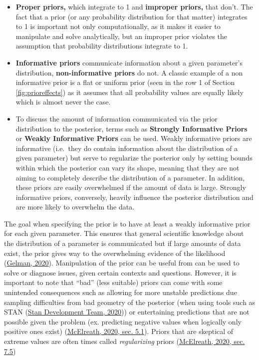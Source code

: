\documentclass[12pt,twoside]{reedthesis}
\begin{document}
\begin{itemize}
\item
  \textbf{Proper priors,} which integrate to 1 and \textbf{improper priors,} that don't. The fact that a prior (or any probability distribution for that matter) integrates to 1 is important not only computationally, as it makes it easier to manipulate and solve analytically, but an improper prior violates the assumption that probability distributions integrate to 1.
\item
  \textbf{Informative priors} communicate information about a given parameter's distribution, \textbf{non-informative priors} do not. A classic example of a non informative prior is a flat or uniform prior (seen in the row 1 of Section \ref{fig:prioreffects}) as it assumes that all probability values are equally likely which is almost never the case.
\item
  To discuss the amount of information communicated via the prior distribution to the posterior, terms such as \textbf{Strongly Informative Priors} or \textbf{Weakly Informative Priors} can be used. Weakly informative priors are informative (i.e.~they do contain information about the distribution of a given parameter) but serve to regularize the posterior only by setting bounds within which the posterior can vary its shape, meaning that they are not aiming to completely describe the distribution of a parameter. In addition, these priors are easily overwhelmed if the amount of data is large. Strongly informative priors, conversely, heavily influence the posterior distribution and are more likely to overwhelm the data.
\end{itemize}
The goal when specifying the prior is to have at least a weakly informative prior for each given parameter. This ensures that general scientific knowledge about the distribution of a parameter is communicated but if large amounts of data exist, the prior gives way to the overwhelming evidence of the likelihood (\protect\hyperlink{ref-gelmanPriorChoiceRecommendations2020}{Gelman, 2020}). Manipulation of the prior can be useful from can be used to solve or diagnose issues, given certain contexts and questions. However, it is important to note that ``bad'' (less suitable) priors can come with some unintended consequences such as allowing for more unstable predictions due sampling difficulties from bad geometry of the posterior (when using tools such as STAN (\protect\hyperlink{ref-standevelopmentteamRStanInterfaceStan2020}{Stan Development Team, 2020})) or entertaining predictions that are not possible given the problem (ex. predicting negative values when logically only positive ones exist) (\protect\hyperlink{ref-mcelreathStatisticalRethinkingBayesian2020}{McElreath, 2020, sec. 5.1}). Priors that are skeptical of extreme values are often times called \emph{regularizing} priors (\protect\hyperlink{ref-mcelreathStatisticalRethinkingBayesian2020}{McElreath, 2020, sec. 7.5})
\end{document}
